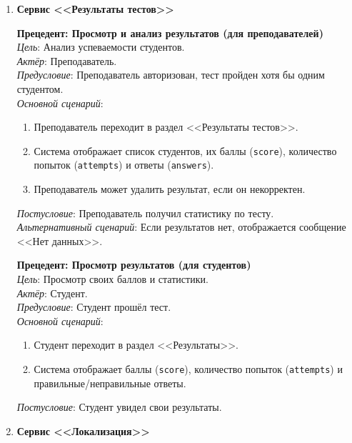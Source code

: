\begin{enumerate}
	\item \textbf{Сервис <<Результаты тестов>>}
	
	\textbf{Прецедент: Просмотр и анализ результатов (для преподавателей)} \\
	\textit{Цель}: Анализ успеваемости студентов. \\
	\textit{Актёр}: Преподаватель. \\
	\textit{Предусловие}: Преподаватель авторизован, тест пройден хотя бы одним студентом. \\
	\textit{Основной сценарий}:
	\begin{enumerate}
		\item Преподаватель переходит в раздел <<Результаты тестов>>.
		\item Система отображает список студентов, их баллы (\texttt{score}), количество попыток (\texttt{attempts}) и ответы (\texttt{answers}).
		\item Преподаватель может удалить результат, если он некорректен.
	\end{enumerate}
	\textit{Постусловие}: Преподаватель получил статистику по тесту. \\
	\textit{Альтернативный сценарий}: Если результатов нет, отображается сообщение <<Нет данных>>.
	
	\textbf{Прецедент: Просмотр результатов (для студентов)} \\
	\textit{Цель}: Просмотр своих баллов и статистики. \\
	\textit{Актёр}: Студент. \\
	\textit{Предусловие}: Студент прошёл тест. \\
	\textit{Основной сценарий}:
	\begin{enumerate}
		\item Студент переходит в раздел <<Результаты>>.
		\item Система отображает баллы (\texttt{score}), количество попыток (\texttt{attempts}) и правильные/неправильные ответы.
	\end{enumerate}
	\textit{Постусловие}: Студент увидел свои результаты.
	
	\item \textbf{Сервис <<Локализация>>}
	

\end{enumerate}
